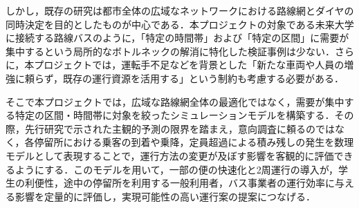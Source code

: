 しかし，既存の研究は都市全体の広域なネットワークにおける路線網とダイヤの同時決定を目的としたものが中心である．本プロジェクトの対象である未来大学に接続する路線バスのように，「特定の時間帯」および「特定の区間」に需要が集中するという局所的なボトルネックの解消に特化した検証事例は少ない．さらに，本プロジェクトでは，運転手不足などを背景とした「新たな車両や人員の増強に頼らず，既存の運行資源を活用する」という制約も考慮する必要がある．

そこで本プロジェクトでは，広域な路線網全体の最適化ではなく，需要が集中する特定の区間・時間帯に対象を絞ったシミュレーションモデルを構築する．その際，先行研究で示された主観的予測の限界を踏まえ，意向調査に頼るのではなく，各停留所における乗客の到着や乗降，定員超過による積み残しの発生を数理モデルとして表現することで，運行方法の変更が及ぼす影響を客観的に評価できるようにする．このモデルを用いて，一部の便の快速化と2周運行の導入が，学生の利便性，途中の停留所を利用する一般利用者，バス事業者の運行効率に与える影響を定量的に評価し，実現可能性の高い運行案の提案につなげる．


